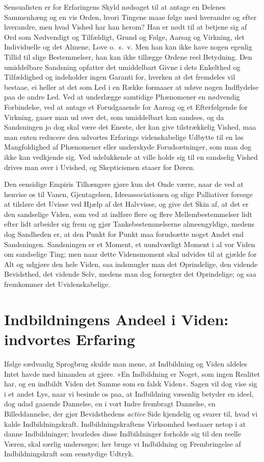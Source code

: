 \documentclass[12pt]{book}
\newcommand{\apage}[1]{\marginnote{\footnotesize\textit{[#1]}}}
\begin{document}
Sensualisten er for Erfaringens Skyld nødsaget til at antage en Delenes
Sammenhæng og en vis Orden, hvori Tingene maae følge med hverandre og
efter hverandre, men hvad Vished har han herom? Han er nødt til at betjene
sig af Ord som Nødvendigt og Tilfældigt, Grund og Følge, Aarsag og
Virkning, det \apage{18} Individuelle og det Almene, Love o.\ s.\ v. Men han kan ikke
have nogen egenlig Tillid til slige Bestemmelser, han kan ikke tillægge
Ordene reel Betydning. Den umiddelbare Sandsning opfatter det umiddelbart
Givne i dets Enkelthed og Tilfældighed og indeholder ingen Garanti for,
hverken at det fremdeles vil bestaae, ei heller at det som Led i en Række
formaaer at udøve nogen Indflydelse paa de andre Led. Ved at underlægge
samtidige Phænomener en nødvendig Forbindelse, ved at antage et
Forudgaaende for Aarsag og et Efterfølgende for Virkning, gaaer man ud
over det, som umiddelbart kan sandses, og da Sandsningen jo dog skal være
det Eneste, der kan give tilstrækkelig Vished, maa man enten reducere den
udvortes Erfarings videnskabelige Udbytte til en løs Mangfoldighed af
Phænomener eller underskyde Forudsætninger, som man dog ikke kan
vedkjende sig. Ved udelukkende at ville holde sig til en sandselig Vished
drives man over i Uvished, og Skepticismen staaer for Døren.

Den eensidige Empiris Tilhængere gjøre kun det Onde værre, naar de ved at
henvise os til Vanen, Gjentagelsen, Ideeassociationen og slige Palliativer
forsøge at tilsløre det Uvisse ved Hjælp af det Halvvisse, og give det
Skin af, at det er den sandselige Viden, som ved at indføre flere og flere
Mellembestemmelser lidt efter lidt arbeider sig frem og gjør
Tankebestemmelserne almeengyldige, medens dog Sandheden er, at den Punkt
for Punkt maa forudsætte noget Andet end Sandsningen. Sandsningen er et
Moment, et uundværligt Moment i al vor Viden om sandselige \apage{19} Ting; men naar
dette Vidensmoment skal udvides til at gjælde for Alt og udgjøre den hele
Viden, saa indsmugler man det Oprindelige, den vidende Bevidsthed, det
vidende Selv, medens man dog fornegter det Oprindelige; og saa fremkommer
det Uvidenskabelige.

\section{Indbildningens Andeel i Viden: indvortes Erfaring}
\label{sec:3}

\noindent Ifølge sædvanlig Sprogbrug skulde man mene, at Indbildning og
Viden aldeles Intet havde med hinanden at gjøre. »En Indbildning er
Noget, som ingen Realitet har, og en indbildt Viden det Samme som en
falsk Viden«. Sagen vil dog vise sig i et andet Lys, naar vi besinde os
paa, at Indbildning væsenlig betyder en ideel, dog udad gaaende Dannelse,
en i vort Indre frembragt Dannelse, en Billeddannelse, der gjør
Bevidsthedens \emph{active} Side kjendelig og svarer til, hvad vi kalde
Indbildningskraft. Indbildningskraftens Virksomhed bestaaer netop i at
danne Indbildninger; hvorledes disse Indbildninger forholde sig til den
reelle Væren, skal særlig undersøges; her bruge vi Indbildning og
Frembringelse af Indbildningskraft som eenstydige Udtryk.
\end{document}

